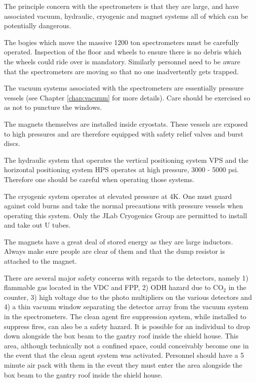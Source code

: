 The principle concern with the spectrometers is that they are large, 
and have associated vacuum, hydraulic, cryogenic and magnet systems all of 
which can be potentially dangerous.

The bogies which move the massive 1200 ton spectrometers must be 
carefully operated.  Inspection of the floor and wheels to ensure there is no 
debris which the wheels could ride over is mandatory.  Similarly 
personnel need to be aware that the spectrometers are moving so that no one 
inadvertently gets trapped.

The vacuum systems associated with the spectrometers are essentially 
pressure vessels (see Chapter \ref{chap:vacuum} for more details).
Care should be exercised so as not to puncture the 
windows.

The magnets themselves are installed inside cryostats.  These vessels 
are exposed to high pressures and are therefore equipped with safety 
relief valves and burst discs.

The hydraulic system that operates the vertical positioning system VPS 
and the horizontal positioning system HPS operates at high pressure, 
3000 - 5000 psi.  Therefore one should be careful when operating those 
systems.

The cryogenic system operates at elevated pressure at 4K.  One must 
guard against cold burns and take the normal precautions with pressure 
vessels when operating this system.  Only the JLab Cryogenics Group are permitted to install 
and take out U tubes.

The magnets have a great deal of stored energy as they are large 
inductors. Always make sure people are clear of them and that
the dump resistor is attached to the magnet.

There are several major safety concerns with regards to the detectors, 
namely 1) flammable gas located in the VDC and FPP, 2) ODH hazard due to 
CO$_2$ in the \Cherenkov{} counter, 3) high voltage due to the photo 
multipliers on the various detectors and 4) a thin vacuum window 
separating the detector array from the vacuum system in the 
spectrometers.  The clean agent fire suppression system, while installed 
to suppress fires, can also be a safety hazard.  It is possible for an 
individual to drop down alongside the box beam to the gantry roof 
inside the shield house.  This area, although technically not a confined 
space, could conceivably become one in the event that the clean agent 
system was activated.  Personnel should have a 5 minute air pack with 
them in the event they must enter the area alongside the box beam to the gantry roof 
inside the shield house.

